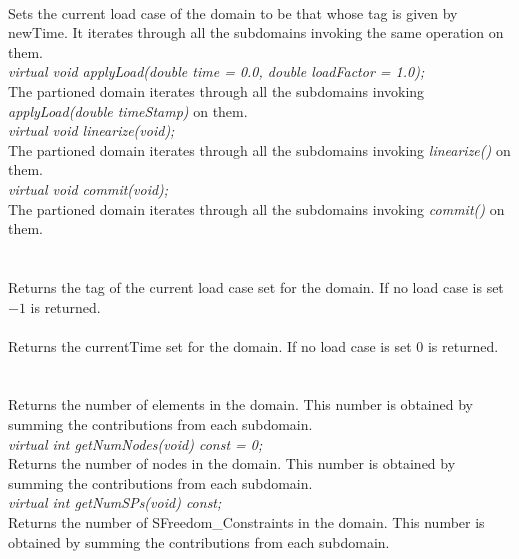  \\
Sets the current load case of the domain to be that whose tag is given
by \p newTime. It iterates through all the subdomains invoking the
same operation on them. \\

{\em virtual void applyLoad(double time = 0.0, double loadFactor
= 1.0);} \\
The partioned domain iterates through all the subdomains invoking {\em
applyLoad(double timeStamp)} on them. \\

{\em virtual void linearize(void);} \\
The partioned domain iterates through all the subdomains invoking {\em
linearize()} on them. \\


{\em virtual void commit(void);} \\
The partioned domain iterates through all the subdomains invoking {\em
commit()} on them. \\

  \\
 \\
Returns the tag of the current load case set for the domain. If no
load case is set $-1$ is returned. \\

 \\
Returns the currentTime set for the domain. If no load case is set $0$
is returned. \\ 

  \\
\\
Returns the number of elements in the domain. This number is obtained
by summing the contributions from each subdomain. \\

{\em virtual int getNumNodes(void) const = 0;}\\
Returns the number of nodes in the domain.
This number is obtained by summing the contributions from each subdomain. \\

{\em virtual int getNumSPs(void) const;}\\
Returns the number of SFreedom\_Constraints in the domain. 
This number is obtained by summing the contributions from each subdomain. \\

